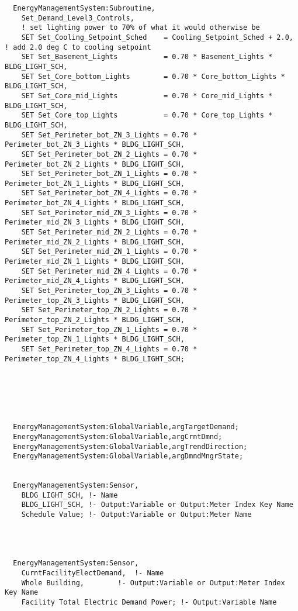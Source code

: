 \begin{lstlisting}
  EnergyManagementSystem:Subroutine,
    Set_Demand_Level3_Controls,
    ! set lighting power to 70% of what it would otherwise be
    SET Set_Cooling_Setpoint_Sched    = Cooling_Setpoint_Sched + 2.0, ! add 2.0 deg C to cooling setpoint
    SET Set_Basement_Lights           = 0.70 * Basement_Lights * BLDG_LIGHT_SCH,
    SET Set_Core_bottom_Lights        = 0.70 * Core_bottom_Lights * BLDG_LIGHT_SCH,
    SET Set_Core_mid_Lights           = 0.70 * Core_mid_Lights * BLDG_LIGHT_SCH,
    SET Set_Core_top_Lights           = 0.70 * Core_top_Lights * BLDG_LIGHT_SCH,
    SET Set_Perimeter_bot_ZN_3_Lights = 0.70 * Perimeter_bot_ZN_3_Lights * BLDG_LIGHT_SCH,
    SET Set_Perimeter_bot_ZN_2_Lights = 0.70 * Perimeter_bot_ZN_2_Lights * BLDG_LIGHT_SCH,
    SET Set_Perimeter_bot_ZN_1_Lights = 0.70 * Perimeter_bot_ZN_1_Lights * BLDG_LIGHT_SCH,
    SET Set_Perimeter_bot_ZN_4_Lights = 0.70 * Perimeter_bot_ZN_4_Lights * BLDG_LIGHT_SCH,
    SET Set_Perimeter_mid_ZN_3_Lights = 0.70 * Perimeter_mid_ZN_3_Lights * BLDG_LIGHT_SCH,
    SET Set_Perimeter_mid_ZN_2_Lights = 0.70 * Perimeter_mid_ZN_2_Lights * BLDG_LIGHT_SCH,
    SET Set_Perimeter_mid_ZN_1_Lights = 0.70 * Perimeter_mid_ZN_1_Lights * BLDG_LIGHT_SCH,
    SET Set_Perimeter_mid_ZN_4_Lights = 0.70 * Perimeter_mid_ZN_4_Lights * BLDG_LIGHT_SCH,
    SET Set_Perimeter_top_ZN_3_Lights = 0.70 * Perimeter_top_ZN_3_Lights * BLDG_LIGHT_SCH,
    SET Set_Perimeter_top_ZN_2_Lights = 0.70 * Perimeter_top_ZN_2_Lights * BLDG_LIGHT_SCH,
    SET Set_Perimeter_top_ZN_1_Lights = 0.70 * Perimeter_top_ZN_1_Lights * BLDG_LIGHT_SCH,
    SET Set_Perimeter_top_ZN_4_Lights = 0.70 * Perimeter_top_ZN_4_Lights * BLDG_LIGHT_SCH;






  EnergyManagementSystem:GlobalVariable,argTargetDemand;
  EnergyManagementSystem:GlobalVariable,argCrntDmnd;
  EnergyManagementSystem:GlobalVariable,argTrendDirection;
  EnergyManagementSystem:GlobalVariable,argDmndMngrState;


  EnergyManagementSystem:Sensor,
    BLDG_LIGHT_SCH, !- Name
    BLDG_LIGHT_SCH, !- Output:Variable or Output:Meter Index Key Name
    Schedule Value; !- Output:Variable or Output:Meter Name




  EnergyManagementSystem:Sensor,
    CurntFacilityElectDemand,  !- Name
    Whole Building,        !- Output:Variable or Output:Meter Index Key Name
    Facility Total Electric Demand Power; !- Output:Variable Name





\end{lstlisting}
